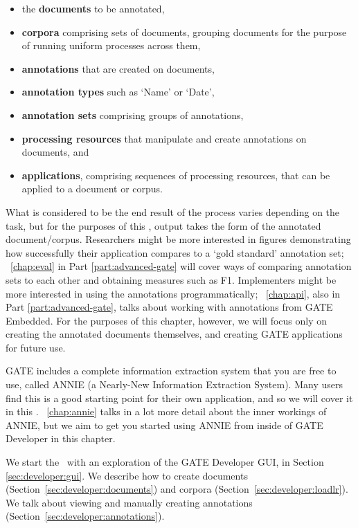 \begin{itemize}
  \item the {\bf documents} to be annotated,
  \item {\bf corpora} comprising sets of documents, grouping documents for the
  purpose of running uniform processes across them,
  \item {\bf annotations} that are created on documents,
  \item {\bf annotation types} such as `Name' or `Date',
  \item {\bf annotation sets} comprising groups of annotations,
  \item {\bf processing resources} that manipulate and create annotations on
  documents, and
  \item {\bf applications}, comprising sequences of processing resources, that
  can be applied to a document or corpus.
\end{itemize}

What is considered to be the end result of the process varies depending on the
task, but for the purposes of this \chapthing, output takes the form of the
annotated document/corpus. Researchers might be more interested in figures
demonstrating how successfully their application compares to a `gold standard'
annotation set; \Chapthing~\ref{chap:eval} in Part \ref{part:advanced-gate} will
cover ways of comparing annotation sets to each other and obtaining measures such
as F1. Implementers might be more interested in using the annotations
programmatically; \Chapthing~\ref{chap:api}, also in Part
\ref{part:advanced-gate}, talks about working with annotations from GATE
Embedded. For the purposes of this chapter, however, we will focus only on
creating the annotated documents themselves, and creating GATE applications for
future use.

GATE includes a complete information extraction system that you are free to
use, called ANNIE (a Nearly-New Information Extraction System). Many users
find this is a good starting point for their own application, and so we will
cover it in this \chapthing. \Chapthing~\ref{chap:annie} talks in a lot more
detail about the inner workings of ANNIE, but we aim to get you started using
ANNIE from inside of GATE Developer in this chapter.

We start the \chapthing\ with an exploration of the GATE Developer GUI, in
Section \ref{sec:developer:gui}. We describe how to create documents
(Section~\ref{sec:developer:documents}) and corpora
(Section~\ref{sec:developer:loadlr}). We talk about viewing and manually
creating annotations (Section~\ref{sec:developer:annotations}).

